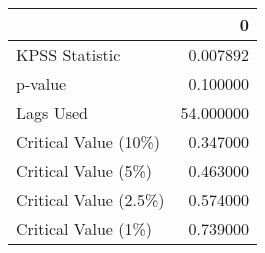 \begin{tabular}{lr}
\toprule
{} &          0 \\
\midrule
KPSS Statistic        &   0.007892 \\
p-value               &   0.100000 \\
Lags Used             &  54.000000 \\
Critical Value (10\%)  &   0.347000 \\
Critical Value (5\%)   &   0.463000 \\
Critical Value (2.5\%) &   0.574000 \\
Critical Value (1\%)   &   0.739000 \\
\bottomrule
\end{tabular}
